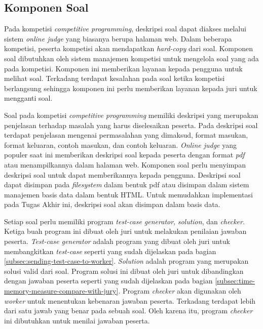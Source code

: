 \subsection{Komponen Soal}

\par Pada kompetisi \textit{competitive programming}, deskripsi soal dapat diakses melalui sistem \textit{online judge} yang biasanya berupa halaman web. Dalam beberapa kompetisi, peserta kompetisi akan mendapatkan \textit{hard-copy} dari soal. Komponen soal dibutuhkan oleh sistem manajemen kompetisi untuk mengelola soal yang ada pada kompetisi. Komponen ini memberikan layanan kepada pengguna untuk melihat soal. Terkadang terdapat kesalahan pada soal ketika kompetisi berlangsung sehingga komponen ini perlu memberikan layanan kepada juri untuk mengganti soal.

\par Soal pada kompetisi \textit{competitive programming} memiliki deskripsi yang merupakan penjelasan terhadap masalah yang harus diselesaikan peserta. Pada deskripsi soal terdapat penjelasan mengenai permasalahan yang dimaksud, format masukan, format keluaran, contoh masukan, dan contoh keluaran. \textit{Online judge} yang populer saat ini memberikan deskripsi soal kepada peserta dengan format \textit{pdf} atau menampilkannya dalam halaman web. Komponen soal perlu menyimpan deskripsi soal untuk dapat memberikannya kepada pengguna. Deskripsi soal dapat disimpan pada \textit{filesystem} dalam bentuk pdf atau disimpan dalam sistem manajemen basis data dalam bentuk HTML. Untuk memudahkan implementasi pada Tugas Akhir ini, deskripsi soal akan disimpan dalam basis data.

\par Setiap soal perlu memiliki program \textit{test-case generator}, \textit{solution}, dan \textit{checker}. Ketiga buah program ini dibuat oleh juri untuk melakukan penilaian jawaban peserta. \textit{Test-case generator} adalah program yang dibuat oleh juri untuk membangkitkan \textit{test-case} seperti yang sudah dijelaskan pada bagian \ref{subsec:sending-test-case-to-worker}. \textit{Solution} adalah program yang merupakan solusi valid dari soal. Program solusi ini dibuat oleh juri untuk dibandingkan dengan jawaban peserta seperti yang sudah dijelaskan pada bagian \ref{subsec:time-memory-measure-compare-with-jury}. Program \textit{checker} akan digunakan oleh \textit{worker} untuk menentukan kebenaran jawaban peserta. Terkadang terdapat lebih dari satu jawab yang benar pada sebuah soal. Oleh karena itu, program \textit{checker} ini dibutuhkan untuk menilai jawaban peserta. 


